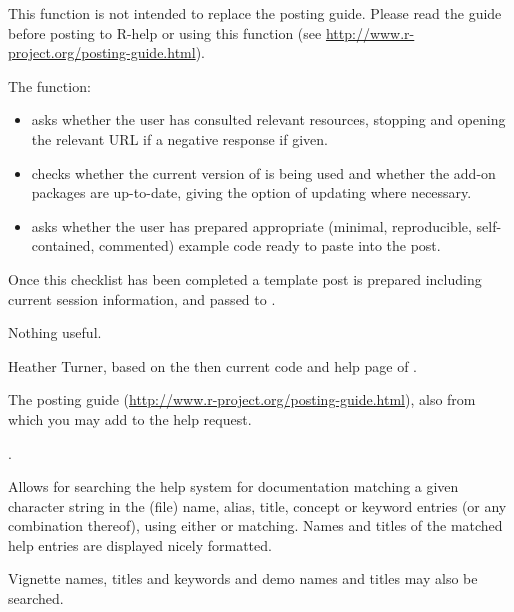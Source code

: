 %
\begin{Details}\relax
This function is not intended to replace the posting
guide.  Please read the guide before posting to R-help or using this
function (see \url{http://www.r-project.org/posting-guide.html}).

The  function:
\begin{itemize}

\item asks whether the user has consulted relevant resources,
stopping and opening the relevant URL if a negative response if
given.
\item checks whether the current version of \R{} is being used and
whether the add-on packages are up-to-date, giving the option of
updating where necessary.
\item asks whether the user has prepared appropriate (minimal,
reproducible, self-contained, commented) example code ready to
paste into the post.

\end{itemize}

Once this checklist has been completed a template post is prepared
including current session information, and passed to
.
\end{Details}
%
\begin{Value}
Nothing useful.
\end{Value}
%
\begin{Author}\relax
Heather Turner, based on the then current code and help page of
.
\end{Author}
%
\begin{SeeAlso}\relax
The posting guide (\url{http://www.r-project.org/posting-guide.html}),
also  from which you may add to the help request.

.
\end{SeeAlso}
%
\begin{Description}\relax
Allows for searching the help system for documentation matching a
given character string in the (file) name, alias, title, concept or
keyword entries (or any combination thereof), using either
 or  matching.  Names
and titles of the matched help entries are displayed nicely formatted.

Vignette names, titles and keywords and demo names and titles
may also be searched.
\end{Description}
